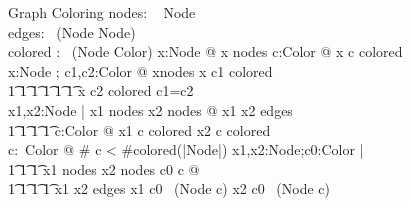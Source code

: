 \documentclass{article}
\begin{document}
\begin{schema}{Graph Coloring}
nodes: \power~ Node \\
edges: \power~(Node \cross Node)\\
colored : \power~(Node \cross Color)
\where
\forall x:Node @ x \in nodes \implies \exists c:Color @ x \mapsto c \in colored\\
\forall x:Node ; c1,c2:Color @ x\in nodes \land x \mapsto c1 \in colored \land \\
 \t1 \t1 \t1 \t1 \t1 \t1 x \mapsto c2 \in colored \implies c1=c2\\
\forall x1,x2:Node | x1 \in nodes \land x2 \in nodes @ x1 \mapsto x2 \in edges \implies \\
\t1 \t1 \t1 \t1 \lnot \exists c:Color @ x1 \mapsto c \in colored \land x2 \mapsto c \in colored\\
\forall c:\power~Color @ \# c < \#colored(|Node|) \implies \exists x1,x2:Node;c0:Color |\\
\t1 \t1 \t1 x1 \in nodes \land x2 \in nodes \land c0 \in c @ \\
\t1 \t1 \t1  \t1 x1 \mapsto x2 \in edges \land x1 \mapsto c0 \in \power~(Node \cross c) \land x2 \mapsto c0 \in \power~(Node \cross c)
\end{schema}
\end{document}
